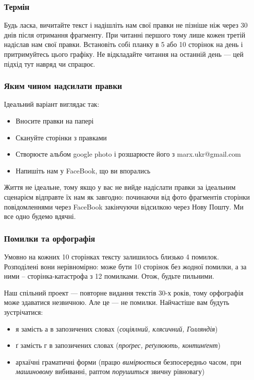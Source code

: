 \documentclass{kapital}
\begin{document}

  \thispagestyle{empty}

  \subsubsection*{Термін}

  Будь ласка, вичитайте текст і надішліть нам свої правки не пізніше ніж через 30 днів після отримання фрагменту.
  При читанні першого тому лише кожен третій надіслав нам свої правки.
  Встановіть собі планку в 5 або 10 сторінок на день і притримуйтесь цього 
  графіку. Не відкладайте читання на останній день — цей підхід тут навряд чи спрацює.

  \subsubsection*{Яким чином надсилати правки}

  Ідеальний варіант виглядає так:
  \begin{itemize}
  \item Вносите правки на папері
  \item Скануйте сторінки з правками
  \item Створюєте альбом google photo і розшарюєте його з marx.ukr@gmail.com
  \item Напишіть нам у FaceBook, що ви впорались
  \end{itemize}

  \noindent{}Життя не ідеальне, тому якщо у вас не вийде надіслати правки за ідеальним
  сценарієм відправте їх нам як завгодно: починаючи від фото фрагментів 
  сторінки повідомленнями через FaceBook закінчуючи відсилкою через Нову Пошту. 
  Ми все одно будемо вдячні.

  \subsubsection*{Помилки та орфографія}

  Умовно на кожних 10 сторінках тексту залишилось близько 4 помилок. 
  Розподілені вони нерівномірно: може бути 10 сторінок без жодної помилки, 
  а за ними – сторінка-катастрофа з 12 помилками. Отож, будьте пильними.

  \smallskip
  \noindent{}Наш спільний проект — повторне видання текстів 30-х років, тому орфографія
  може здаватися незвичною. Але це — не помилки. Найчастіше вам будуть
  зустрічатися:
  \begin{itemize}
  \item я замість а в запозичених словах (\emph{соціялний, клясичний, Голляндія})
  \item ґ замість г в запозичених словах (\emph{проґрес, реґулюють, континґент})
  \item архаїчні граматичні форми (працю \emph{вимірюється} безпосередньо часом, при \emph{машиновому} вибиванні, раптом \emph{порушиться} звичну рівновагу)
  \end{itemize}
\end{document}
